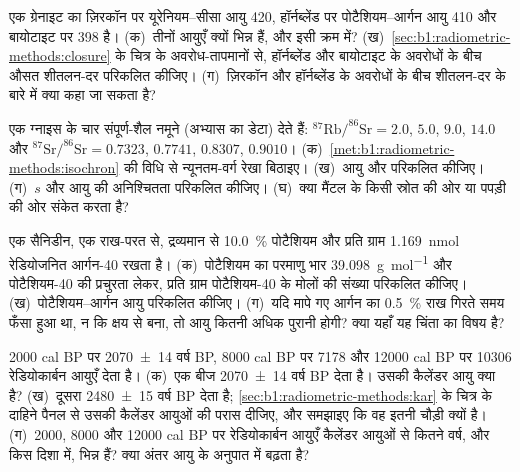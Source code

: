 \begin{exercise}[$\star$]\label{exo:b1:radiometric-methods:4}
एक ग्रेनाइट का ज़िरकॉन पर यूरेनियम–सीसा आयु \qty{420}{\Ma}, हॉर्नब्लेंड पर पोटैशियम–आर्गन आयु \qty{410}{\Ma} और बायोटाइट पर \qty{398}{\Ma} है। (क)~तीनों आयुएँ क्यों भिन्न हैं, और इसी क्रम में? (ख)~\cref{sec:b1:radiometric-methods:closure} के चित्र के अवरोध-तापमानों से, हॉर्नब्लेंड और बायोटाइट के अवरोधों के बीच औसत शीतलन-दर परिकलित कीजिए। (ग)~ज़िरकॉन और हॉर्नब्लेंड के अवरोधों के बीच शीतलन-दर के बारे में क्या कहा जा सकता है?
\end{exercise}

\begin{exercise}[$\star\star$]\label{exo:b1:radiometric-methods:5}
एक ग्नाइस के चार संपूर्ण-शैल नमूने (अभ्यास का डेटा) देते हैं: $^{87}\mathrm{Rb}/^{86}\mathrm{Sr} = 2.0$, $5.0$, $9.0$, $14.0$ और
$^{87}\mathrm{Sr}/^{86}\mathrm{Sr} = 0.7323$, $0.7741$, $0.8307$, $0.9010$। (क)~\cref{met:b1:radiometric-methods:isochron} की विधि से न्यूनतम-वर्ग रेखा बिठाइए। (ख)~आयु और  परिकलित कीजिए। (ग)~$s$ और आयु की अनिश्चितता परिकलित कीजिए। (घ)~क्या  मैंटल के किसी स्रोत की ओर या पपड़ी की ओर संकेत करता है?
\end{exercise}

\begin{exercise}[$\star\star$]\label{exo:b1:radiometric-methods:6}
एक सैनिडीन, एक राख-परत से, द्रव्यमान से \qty{10.0}{\percent} पोटैशियम और प्रति ग्राम \qty{1.169}{nmol} रेडियोजनित आर्गन-40 रखता है। (क)~पोटैशियम का परमाणु भार \qty{39.098}{g.mol^{-1}} और पोटैशियम-40 की प्रचुरता लेकर, प्रति ग्राम पोटैशियम-40 के मोलों की संख्या परिकलित कीजिए। (ख)~पोटैशियम–आर्गन आयु परिकलित कीजिए। (ग)~यदि मापे गए आर्गन का \qty{0.5}{\percent} राख गिरते समय फँसा हुआ था, न कि क्षय से बना, तो आयु कितनी अधिक पुरानी होगी? क्या यहाँ यह चिंता का विषय है?
\end{exercise}

\begin{exercise}[$\star\star$]\label{exo:b1:radiometric-methods:7}
 \num{2000} cal BP पर \num[uncertainty-mode=separate]{2070 \pm 14} वर्ष BP, \num{8000} cal BP पर \num{7178} और \num{12000} cal BP पर \num{10306} रेडियोकार्बन आयुएँ देता है। (क)~एक बीज \num[uncertainty-mode=separate]{2070 \pm 14} वर्ष BP देता है। उसकी कैलेंडर आयु क्या है? (ख)~दूसरा \num[uncertainty-mode=separate]{2480 \pm 15} वर्ष BP देता है; \cref{sec:b1:radiometric-methods:kar} के चित्र के दाहिने पैनल से उसकी कैलेंडर आयुओं की परास दीजिए, और समझाइए कि वह इतनी चौड़ी क्यों है। (ग)~\num{2000}, \num{8000} और \num{12000} cal BP पर रेडियोकार्बन आयुएँ कैलेंडर आयुओं से कितने वर्ष, और किस दिशा में, भिन्न हैं? क्या अंतर आयु के अनुपात में बढ़ता है?
\end{exercise}

